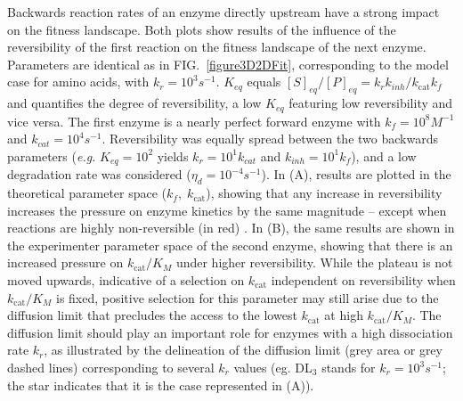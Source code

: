 \documentclass[11pt,onecolumn]{article}
\providecommand{\DIFdel}[1]{{\protect\color{red} \scriptsize #1}} %
\providecommand{\DIFdelbegin}{} %
\providecommand{\DIFdelFL}[1]{\DIFdel{#1}} %
\begin{document}
\DIFdelbegin %
\DIFdelFL{\hspace{-1.3cm}
}%
\DIFdelFL{\hspace{-1.3cm}
}%
{%
\DIFdelFL{Backwards reaction rates of an enzyme directly upstream have a strong impact on the fitness landscape. Both plots show results of the influence of the reversibility of the first reaction on the fitness landscape of the next enzyme. Parameters are identical as in FIG.~\ref{figure3D2DFit}, corresponding to the model case for amino acids, with $k_r=10^3s^{-1}$. $K_{eq}$ equals $[S]_{eq}/[P]_{eq}=k_rk_{inh}/k_\text{cat}k_f$ \citep{Klipp94} and quantifies the degree of reversibility, a low $K_{eq}$ featuring low reversibility and vice versa. The first enzyme is a nearly perfect forward enzyme with $k_f=10^{8}M^{-1}$ and $k_{cat}=10^4s^{-1}$. 
Reversibility was equally spread between the two backwards parameters (\textit{e.g.} $K_{eq}=10^2$ yields $k_r=10^{1}k_{cat}$ and $k_{inh}=10^{1}k_f$), and a low degradation rate was considered ($\eta_d=10^{-4}s^{-1}$). In (A), results are plotted in the theoretical parameter space ($k_f, \; k_\text{cat}$), showing that any increase in reversibility increases the pressure on enzyme kinetics by the same magnitude -- except when reactions are highly non-reversible (in red)
. In (B), the same results are shown in the experimenter parameter space of the second enzyme, showing that there is an increased pressure on $k_\text{cat}/K_M$ under higher reversibility. 
While the plateau is not moved upwards, indicative of a selection on $k_\text{cat}$ independent on reversibility when $k_\text{cat}/K_M$ is fixed, positive selection for this parameter may still arise due to the diffusion limit that precludes the access to the lowest $k_\text{cat}$ at high $k_\text{cat}/K_M$. The diffusion limit should play an important role for enzymes with a high dissociation rate $k_r$, as illustrated by the delineation of the diffusion limit (grey area or grey dashed lines) corresponding to several $k_r$ values (eg. DL$_3$ stands for $k_r=10^3s^{-1}$; the star indicates that it is the case represented in (A)).}}
\end{document}
